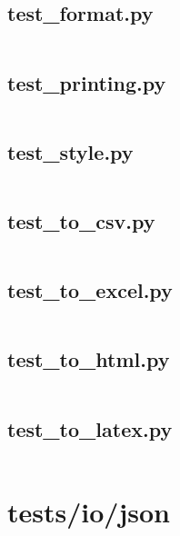 \documentclass{article}
\begin{document}
\subsection{test\_format.py}
\inputminted{python}{/home/dufferzafar/dev/@clones/pandas/pandas/tests/io/formats/test_format.py}
\newpage

\subsection{test\_printing.py}
\inputminted{python}{/home/dufferzafar/dev/@clones/pandas/pandas/tests/io/formats/test_printing.py}
\newpage

\subsection{test\_style.py}
\inputminted{python}{/home/dufferzafar/dev/@clones/pandas/pandas/tests/io/formats/test_style.py}
\newpage

\subsection{test\_to\_csv.py}
\inputminted{python}{/home/dufferzafar/dev/@clones/pandas/pandas/tests/io/formats/test_to_csv.py}
\newpage

\subsection{test\_to\_excel.py}
\inputminted{python}{/home/dufferzafar/dev/@clones/pandas/pandas/tests/io/formats/test_to_excel.py}
\newpage

\subsection{test\_to\_html.py}
\inputminted{python}{/home/dufferzafar/dev/@clones/pandas/pandas/tests/io/formats/test_to_html.py}
\newpage

\subsection{test\_to\_latex.py}
\inputminted{python}{/home/dufferzafar/dev/@clones/pandas/pandas/tests/io/formats/test_to_latex.py}
\newpage

\section{tests/io/json}
\end{document}
